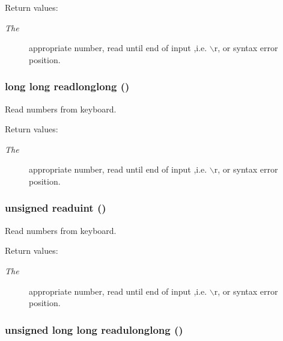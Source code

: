 \begin{Desc}
\item[Return values: ]\par
\begin{description}
\item[{\em 
The}]appropriate number, read until end of input ,i.e. $\backslash$r, or syntax error position. \end{description}
\end{Desc}
\subsubsection{\setlength{\rightskip}{0pt plus 5cm}long long readlonglong ()}\label{hpstdio_8h_a15}


Read numbers from keyboard.

\begin{Desc}
\item[Return values: ]\par
\begin{description}
\item[{\em 
The}]appropriate number, read until end of input ,i.e. $\backslash$r, or syntax error position. \end{description}
\end{Desc}
\subsubsection{\setlength{\rightskip}{0pt plus 5cm}unsigned readuint ()}\label{hpstdio_8h_a13}


Read numbers from keyboard.

\begin{Desc}
\item[Return values: ]\par
\begin{description}
\item[{\em 
The}]appropriate number, read until end of input ,i.e. $\backslash$r, or syntax error position. \end{description}
\end{Desc}
\subsubsection{\setlength{\rightskip}{0pt plus 5cm}unsigned long long readulonglong ()}\label{hpstdio_8h_a16}


